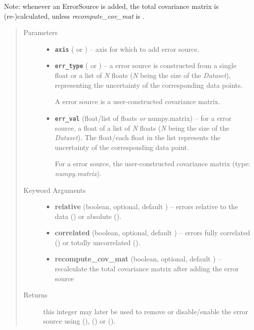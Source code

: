 \documentclass[a4paper,10pt,english]{sphinxmanual}
\begin{document}
\begin{fulllineitems}
\begin{fulllineitems}
Note: whenever an ErrorSource is added, the total covariance matrix
is (re-)calculated, unless \emph{recompute\_cov\_mat} is .
\begin{quote}\begin{description}
\item[{Parameters}] \leavevmode\begin{itemize}
\item {} 
\textbf{\texttt{axis}} ( or ) -- axis for which to add error source.

\item {} 
\textbf{\texttt{err\_type}} ( or ) -- 
a  error source is constructed from a single float or
a list of \emph{N} floats (\emph{N} being the size of the \emph{Dataset}),
representing the uncertainty of the corresponding data points.

A  error source is a user-constructed covariance
matrix.


\item {} 
\textbf{\texttt{err\_val}} (float/list of floats \emph{or} numpy.matrix) -- 
for a  error source, a float of a list of \emph{N} floats
(\emph{N} being the size of the \emph{Dataset}). The float/each float in the
list represents the uncertainty of the corresponding data point.

For a  error source, the user-constructed covariance
matrix (type: \emph{numpy.matrix}).


\end{itemize}

\item[{Keyword Arguments}] \leavevmode\begin{itemize}
\item {} 
\textbf{relative} (boolean, optional, default ) --
errors relative to the data () or absolute ().

\item {} 
\textbf{correlated} (boolean, optional, default ) --
errors fully correlated () or totally uncorrelated
().

\item {} 
\textbf{recompute\_cov\_mat} (boolean, optional, default ) --
recalculate the total covariance matrix after adding the error
source

\end{itemize}

\item[{Returns}] \leavevmode
this integer may later be used to remove or disable/enable the
error source using
{\hyperref[index:kafe.dataset.Dataset.remove_error_source]{\emph{}}} (),
{\hyperref[index:kafe.dataset.Dataset.disable_error_source]{\emph{}}} () or
{\hyperref[index:kafe.dataset.Dataset.enable_error_source]{\emph{}}} ().


\end{description}
\end{quote}
\end{fulllineitems}
\end{fulllineitems}
\end{document}
